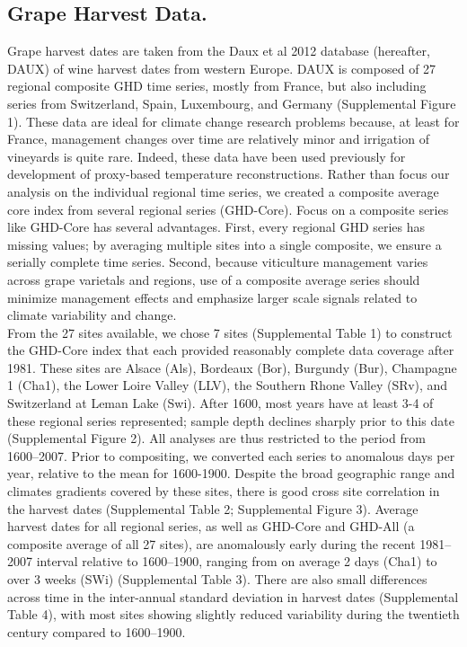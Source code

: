 \documentclass{nature}
\begin{document}

\begin{methods}
\subsection{Grape Harvest Data.}
\noindent Grape harvest dates are taken from the Daux et al 2012 database (hereafter, DAUX) of wine harvest dates from western Europe\cite{Daux2012}. DAUX is composed of 27 regional composite GHD time series, mostly from France, but also including series from Switzerland, Spain, Luxembourg, and Germany (Supplemental Figure 1). These data are ideal for climate change research problems because, at least for France, management changes over time are relatively minor and irrigation of vineyards is quite rare. Indeed, these data have been used previously for development of proxy-based temperature reconstructions\cite{Daux2012}. Rather than focus our analysis on the individual regional time series, we created a composite average core index from several regional series (GHD-Core). Focus on a composite series like GHD-Core has several advantages. First, every regional GHD series has missing values; by averaging multiple sites into a single composite, we ensure a serially complete time series. Second, because viticulture management varies across grape varietals and regions, use of a composite average series should minimize management effects and emphasize larger scale signals related to climate variability and change.\\
\indent From the 27 sites available, we chose 7 sites (Supplemental Table 1) to construct the GHD-Core index that each provided reasonably complete data coverage after 1981. These sites are Alsace (Als), Bordeaux (Bor), Burgundy (Bur), Champagne 1 (Cha1), the Lower Loire Valley (LLV), the Southern Rhone Valley (SRv), and Switzerland at Leman Lake (Swi). After 1600, most years have at least 3-4 of these regional series represented; sample depth declines sharply prior to this date (Supplemental Figure 2). All analyses are thus restricted to the period from 1600--2007. Prior to compositing, we converted each series to anomalous days per year, relative to the mean for 1600-1900. Despite the broad geographic range and climates gradients covered by these sites, there is good cross site correlation in the harvest dates (Supplemental Table 2; Supplemental Figure 3). Average harvest dates for all regional series, as well as GHD-Core and GHD-All (a composite average of all 27 sites), are anomalously early during the recent 1981--2007 interval relative to 1600--1900, ranging from on average 2 days (Cha1) to over 3 weeks (SWi) (Supplemental Table 3). There are also small differences across time in the inter-annual standard deviation in harvest dates (Supplemental Table 4), with most sites showing slightly reduced variability during the twentieth century compared to 1600--1900.

\end{methods}
\end{document}
